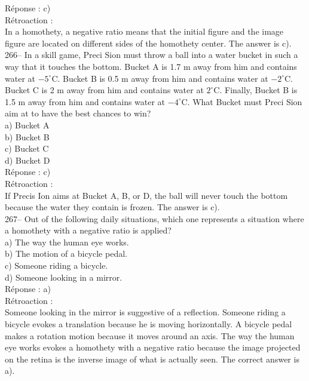 \documentclass[letterpaper, 12pt]{article}
\begin{document}
R\'eponse : c)\\

R\'etroaction : \\
In a homothety, a negative ratio means that the initial figure and
the image figure are located on different sides of the homothety
center. The answer is c).\\


266-- In a skill game, Preci Sion must throw a ball into a water
bucket in such a way that it touches the bottom. Bucket A is 1.7 m
away from him and contains water at $-5^{\circ}$C. Bucket B is 0.5 m
away from him and contains water at $-2^{\circ}$C. Bucket C is 2 m
away from him and contains water at $2^{\circ}$C. Finally, Bucket B
is 1.5 m away from him and contains water at $-4^{\circ}$C.  What
Bucket must Preci
Sion aim at to have the best chances to win?\\

a) Bucket A\\
b) Bucket B\\
c) Bucket C\\
d) Bucket D\\

R\'eponse : c)\\

R\'etroaction : \\
If Precis Ion aims at Bucket A, B, or D, the ball will never touch
the bottom because the water they contain is frozen. The
answer is c).\\

267-- Out of the following daily situations, which one represents a
situation where a homothety with a negative ratio is applied?\\

a) The way the human eye works.\\
b) The motion of a bicycle pedal.\\
c) Someone riding a bicycle.\\
d) Someone looking in a mirror.\\

R\'eponse : a)\\

R\'etroaction : \\
Someone looking in the mirror is suggestive of a reflection. Someone
riding a bicycle evokes a translation because he is moving
horizontally. A bicycle pedal makes a rotation motion because it
moves around an axis. The way the human eye works evokes a homothety
with a negative ratio because the image projected on the retina is
the inverse image of what is actually seen. The correct answer is a).\\
\end{document}
